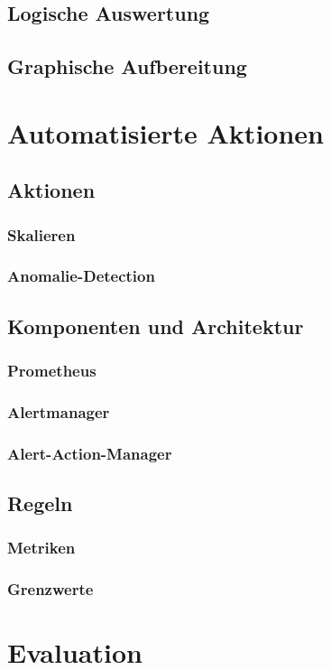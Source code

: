 \documentclass[a4paper,12pt]{scrartcl}
\begin{document}
\subsection{Logische Auswertung}
\subsection{Graphische Aufbereitung}

\section{Automatisierte Aktionen}
\subsection{Aktionen}
\subsubsection{Skalieren}
\subsubsection{Anomalie-Detection}
\subsection{Komponenten und Architektur}
\subsubsection{Prometheus}
\subsubsection{Alertmanager}
\subsubsection{Alert-Action-Manager}
\subsection{Regeln}
\subsubsection{Metriken}
\subsubsection{Grenzwerte}

\section{Evaluation}
\end{document}
